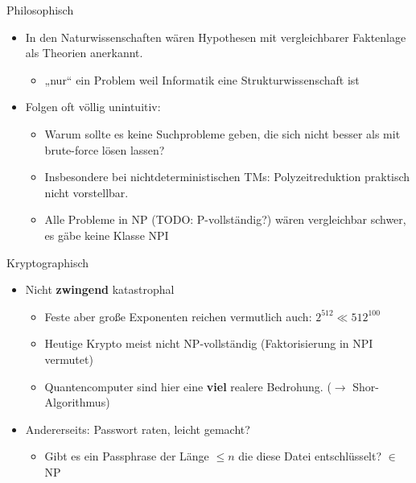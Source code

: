 \documentclass[ignorenonframetext,]{beamer}
\begin{document}
\begin{frame}{Philosophisch}

\begin{itemize}
\itemsep1pt\parskip0pt
\item
  In den Naturwissenschaften wären Hypothesen mit vergleichbarer
  Faktenlage als Theorien anerkannt.

  \begin{itemize}
  \itemsep1pt\parskip0pt
  \item
    „nur`` ein Problem weil Informatik eine Strukturwissenschaft ist
  \end{itemize}
\item
  Folgen oft völlig unintuitiv:

  \begin{itemize}
  \itemsep1pt\parskip0pt
  \item
    Warum sollte es keine Suchprobleme geben, die sich nicht besser als
    mit brute-force lösen lassen?
  \item
    Insbesondere bei nichtdeterministischen TMs: Polyzeitreduktion
    praktisch nicht vorstellbar.
  \item
    Alle Probleme in NP (TODO: P-vollständig?) wären vergleichbar
    schwer, es gäbe keine Klasse NPI
  \end{itemize}
\end{itemize}

\end{frame}

\begin{frame}{Kryptographisch}

\begin{itemize}
\itemsep1pt\parskip0pt
\item
  Nicht \textbf{zwingend} katastrophal

  \begin{itemize}
  \itemsep1pt\parskip0pt
  \item
    Feste aber große Exponenten reichen vermutlich auch:
    $2^{512} \ll 512^{100}$
  \item
    Heutige Krypto meist nicht NP-vollständig (Faktorisierung in NPI
    vermutet)
  \item
    Quantencomputer sind hier eine \textbf{viel} realere Bedrohung.
    ($\rightarrow$ Shor-Algorithmus)
  \end{itemize}
\item
  Andererseits: Passwort raten, leicht gemacht?

  \begin{itemize}
  \itemsep1pt\parskip0pt
  \item
    Gibt es ein Passphrase der Länge $\le n$ die diese Datei
    entschlüsselt? $\in$ NP
  \end{itemize}
\end{itemize}

\end{frame}
\end{document}
